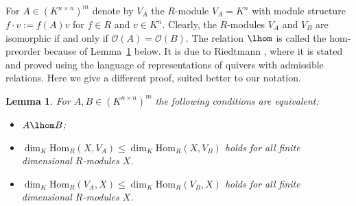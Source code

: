 \documentclass[12pt]{amsart}
\newtheorem{lemma}[theorem]{\bf Lemma}
\newcommand{\field}{K}
\renewcommand{\hom}{\mathrm{Hom}}
\begin{document}
For $A\in (\field^{n\times n})^m$ denote by $V_A$ the $R$-module 
$V_A=\field^n$ with module structure $f\cdot v:=f(A)v$ for 
$f\in R$ and $v\in \field^n$. 
Clearly, the $R$-modules $V_A$ and $V_B$ are isomorphic 
if and only if $\mathcal{O}(A)=\mathcal{O}(B)$. 
The relation $\lhom$ is called the hom-preorder because of 
Lemma~\ref{lemma:hom-rank} below. It is due to 
Riedtmann \cite[Section 2.1, Lemma]{Riedtmann1},   
where it is stated and proved using the language of representations of quivers with admissible 
relations. 
Here we give a different proof, suited better to our notation.  

\begin{lemma} \label{lemma:hom-rank}
For $A,B\in (\field^{n\times n})^m$ the following conditions are equivalent: 
\begin{itemize}
    \item[(i)] $A\lhom B$;  
\item[(ii)] $\dim_\field\hom_R(X,V_A) 
\le \dim_\field\hom_R(X,V_B)$  
holds for all 
finite dimensional $R$-modules $X$. 
\item[(iii)] $\dim_\field\hom_R(V_A,X) 
\le \dim_\field\hom_R(V_B,X)$  
holds for all 
finite dimensional $R$-modules $X$.
\end{itemize}
\end{lemma}
\end{document}

